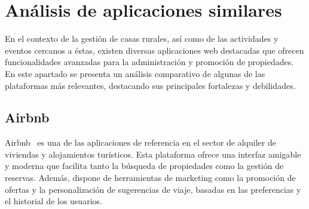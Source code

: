 
\section{Análisis de aplicaciones similares}

En el contexto de la gestión de casas rurales, así como de las actividades y eventos cercanos a éstas, existen diversas aplicaciones web destacadas que ofrecen funcionalidades avanzadas para la administración y promoción de propiedades. En este apartado se presenta un análisis comparativo de algunas de las plataformas más relevantes, destacando sus principales fortalezas y debilidades.
\subsection{Airbnb}
Airbnb~\cite{airbnb} es una de las aplicaciones de referencia en el sector de alquiler de viviendas y alojamientos turísticos. Esta plataforma ofrece una interfaz amigable y moderna que facilita tanto la búsqueda de propiedades como la gestión de reservas. Además, dispone de herramientas de marketing como la promoción de ofertas y la personalización de sugerencias de viaje, basadas en las preferencias y el historial de los usuarios.

